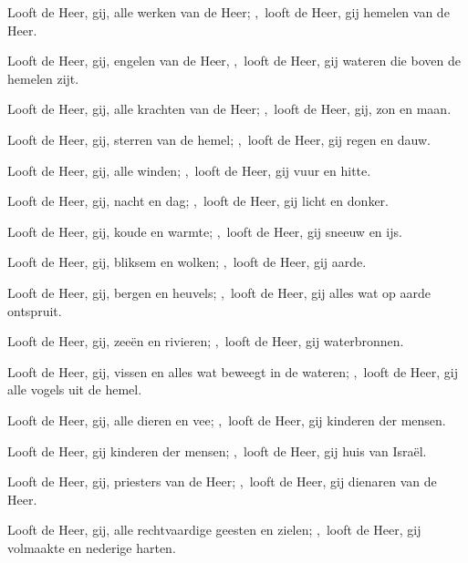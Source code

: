 \documentclass[12pt,twoside,a5paper]{article}
\begin{document}
\begin{halfparskip}
\end{halfparskip}



Looft de Heer, gij, alle werken van de Heer; \sep~looft de Heer, gij hemelen van de Heer.

\begin{halfparskip}

  Looft de Heer, gij, engelen van de Heer, \sep~looft de Heer, gij wateren die boven de hemelen zijt.

  Looft de Heer, gij, alle krachten van de Heer; \sep~looft de Heer, gij, zon en maan.

  Looft de Heer, gij, sterren van de hemel; \sep~looft de Heer, gij regen en dauw.

  Looft de Heer, gij, alle winden; \sep~looft de Heer, gij vuur en hitte.

  Looft de Heer, gij, nacht en dag; \sep~looft de Heer, gij licht en donker.

  Looft de Heer, gij, koude en warmte; \sep~looft de Heer, gij sneeuw en ijs.

  Looft de Heer, gij, bliksem en wolken; \sep~looft de Heer, gij aarde.

  Looft de Heer, gij, bergen en heuvels; \sep~looft de Heer, gij alles wat op aarde ontspruit.

  Looft de Heer, gij, zeeën en rivieren; \sep~looft de Heer, gij waterbronnen.

  Looft de Heer, gij, vissen en alles wat beweegt in de wateren; \sep~looft de Heer, gij alle vogels uit de hemel.

  Looft de Heer, gij, alle dieren en vee; \sep~looft de Heer, gij kinderen der mensen.

  Looft de Heer, gij kinderen der mensen; \sep~looft de Heer, gij huis van Israël.

  Looft de Heer, gij, priesters van de Heer; \sep~looft de Heer, gij dienaren van de Heer.

  Looft de Heer, gij, alle rechtvaardige geesten en zielen; \sep~looft de Heer, gij volmaakte en nederige harten.


\end{halfparskip}
\end{document}
